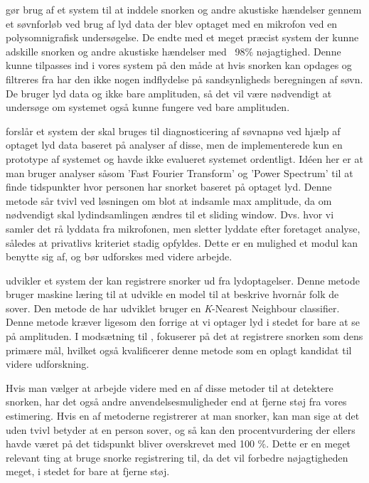 \citet{Dafna2013} gør brug af et system til at inddele snorken og andre akustiske hændelser gennem et søvnforløb ved brug af lyd data der blev optaget med en mikrofon ved en polysomnigrafisk undersøgelse. 
De endte med et meget præcist system der kunne adskille snorken og andre akustiske hændelser med ~98\% nøjagtighed.
Denne kunne tilpasses ind i vores system på den måde at hvis snorken kan opdages og filtreres fra har den ikke nogen indflydelse på sandsynligheds beregningen af søvn. 
De bruger lyd data og ikke bare amplituden, så det vil være nødvendigt at undersøge om systemet også kunne fungere ved bare amplituden.

\citet{Calabrese20111101} forslår et system der skal bruges til diagnosticering af søvnapnø ved hjælp af optaget lyd data baseret på analyser af disse, men de implementerede kun en prototype af systemet og havde ikke evalueret systemet ordentligt. 
Idéen her er at man bruger analyser såsom 'Fast Fourier Transform' og 'Power Spectrum' til at finde tidspunkter hvor personen har snorket baseret på optaget lyd. 
Denne metode sår tvivl ved løsningen om blot at indsamle max amplitude, da om nødvendigt skal lydindsamlingen ændres til et sliding window.
Dvs. hvor vi samler det rå lyddata fra mikrofonen, men sletter lyddate efter foretaget analyse, således at privatlivs kriteriet stadig opfyldes.
Dette er en mulighed et modul kan benytte sig af, og bør udforskes med videre arbejde.

\citet{7051338} udvikler et system der kan registrere snorker ud fra lydoptagelser.
Denne metode bruger maskine læring til at udvikle en model til at beskrive hvornår folk de sover.
Den metode de har udviklet bruger en \textit{K}-Nearest Neighbour classifier.
Denne metode kræver ligesom den forrige at vi optager lyd i stedet for bare at se på amplituden.
I modsætning til \citet{Calabrese20111101}, fokuserer \citet{7051338} på det at registrere snorken som dens primære mål, hvilket også kvalificerer denne metode som en oplagt kandidat til videre udforskning.

Hvis man vælger at arbejde videre med en af disse metoder til at detektere snorken, har det også andre anvendelsesmuligheder end at fjerne støj fra vores estimering.
Hvis en af metoderne registrerer at man snorker, kan man sige at det uden tvivl betyder at en person sover, og så kan den procentvurdering der ellers havde været på det tidspunkt bliver overskrevet med 100 \%.
Dette er en meget relevant ting at bruge snorke registrering til, da det vil forbedre nøjagtigheden meget, i stedet for bare at fjerne støj.

